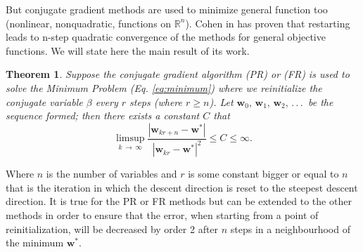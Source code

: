 \documentclass[11pt]{article}
\newtheorem{theorem}{Theorem}[section]
\begin{document}
But conjugate gradient methods are used to minimize general function too (nonlinear, nonquadratic, functions on $\mathbb{R}^n$). Cohen in \cite{Cohen_rate_conv} has proven that restarting leads to n-step quadratic convergence of the methods for general objective functions. We will state here the main result of its work.
\begin{theorem}
\label{th:cohen_rate_cg}
    Suppose the conjugate gradient algorithm (PR) or (FR) is used to solve the Minimum Problem (Eq. \ref{eq:minimum}) where we reinitialize the conjugate variable $\beta$ every $r$ steps (where $r \geq n$). Let $\mathbf{w}_0, \,\mathbf{w}_1, \,\mathbf{w}_2,\, .\, .\, .\,$ be the sequence formed; then there exists a constant $C$ that
    \begin{equation}
     \limsup\limits_{k\,\rightarrow\, \infty} \frac{|\mathbf{w}_{kr + n} - \mathbf{w}^*|}{|\mathbf{w}_{kr} - \mathbf{w}^*|^2} \leq C \leq \infty.
    \end{equation}
\end{theorem}
Where $n$ is the number of variables and $r$ is some constant bigger or equal to $n$ that is the iteration in which the descent direction is reset to the steepest descent direction. It is true for the PR or FR methods but can be extended to the other methods in order to ensure that the error, when starting from a point of reinitialization, will be decreased by order 2 after $n$ steps in a neighbourhood of the minimum $\mathbf{w}^*$.
\end{document}
